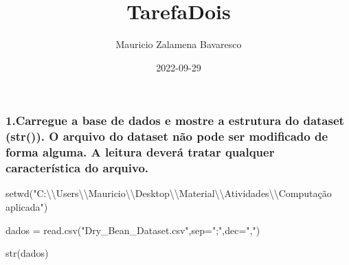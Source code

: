 \documentclass[
]{article}
\title{TarefaDois}
\author{Mauricio Zalamena Bavaresco}
\date{2022-09-29}
\newenvironment{Shaded}{\begin{snugshade}}{\end{snugshade}}
\newcommand{\AttributeTok}[1]{\textcolor[rgb]{0.77,0.63,0.00}{#1}}
\newcommand{\FunctionTok}[1]{\textcolor[rgb]{0.00,0.00,0.00}{#1}}
\newcommand{\NormalTok}[1]{#1}
\newcommand{\OtherTok}[1]{\textcolor[rgb]{0.56,0.35,0.01}{#1}}
\newcommand{\SpecialCharTok}[1]{\textcolor[rgb]{0.00,0.00,0.00}{#1}}
\newcommand{\StringTok}[1]{\textcolor[rgb]{0.31,0.60,0.02}{#1}}
\begin{document}
\maketitle

\hypertarget{carregue-a-base-de-dados-e-mostre-a-estrutura-do-dataset-str.-o-arquivo-do-dataset-nuxe3o-pode-ser-modificado-de-forma-alguma.-a-leitura-deveruxe1-tratar-qualquer-caracteruxedstica-do-arquivo.}{%
\subsubsection{1.Carregue a base de dados e mostre a estrutura do
dataset (str()). O arquivo do dataset não pode ser modificado de forma
alguma. A leitura deverá tratar qualquer característica do
arquivo.}\label{carregue-a-base-de-dados-e-mostre-a-estrutura-do-dataset-str.-o-arquivo-do-dataset-nuxe3o-pode-ser-modificado-de-forma-alguma.-a-leitura-deveruxe1-tratar-qualquer-caracteruxedstica-do-arquivo.}}

\begin{Shaded}
\begin{Highlighting}[]
\FunctionTok{setwd}\NormalTok{(}\StringTok{"C:}\SpecialCharTok{\textbackslash{}\textbackslash{}}\StringTok{Users}\SpecialCharTok{\textbackslash{}\textbackslash{}}\StringTok{Mauricio}\SpecialCharTok{\textbackslash{}\textbackslash{}}\StringTok{Desktop}\SpecialCharTok{\textbackslash{}\textbackslash{}}\StringTok{Material}\SpecialCharTok{\textbackslash{}\textbackslash{}}\StringTok{Atividades}\SpecialCharTok{\textbackslash{}\textbackslash{}}\StringTok{Computação aplicada"}\NormalTok{)}

\NormalTok{dados }\OtherTok{=} \FunctionTok{read.csv}\NormalTok{(}\StringTok{"Dry\_Bean\_Dataset.csv"}\NormalTok{,}\AttributeTok{sep=}\StringTok{";"}\NormalTok{,}\AttributeTok{dec=}\StringTok{","}\NormalTok{)}
\end{Highlighting}
\end{Shaded}

\begin{Shaded}
\begin{Highlighting}[]
\FunctionTok{str}\NormalTok{(dados)}
\end{Highlighting}
\end{Shaded}
\end{document}
